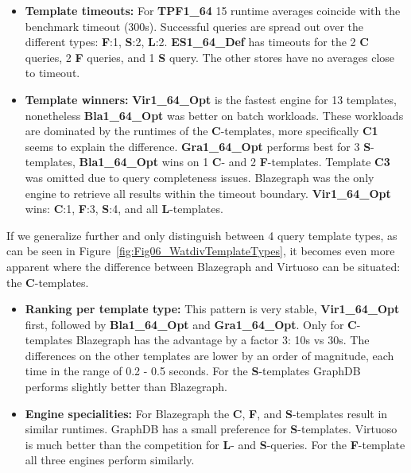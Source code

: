 \begin{itemize}
	\item \textbf{Template timeouts:} For \textbf{TPF1\_64} 15 runtime averages coincide with the benchmark timeout (300s). Successful queries are spread out over the different types: \textbf{F}:1, \textbf{S}:2, \textbf{L}:2.
	\textbf{ES1\_64\_Def} has timeouts for the 2 \textbf{C} queries,  2 \textbf{F} queries, and 1 \textbf{S} query. The other stores have no averages close to timeout.
	
	\item  \textbf{Template winners:} \textbf{Vir1\_64\_Opt} is the fastest engine for 13 templates, nonetheless \textbf{Bla1\_64\_Opt} was better on batch workloads. These workloads are dominated by the runtimes of the \textbf{C}-templates, more specifically \textbf{C1} seems to explain the difference. 
	\textbf{Gra1\_64\_Opt} performs best for 3 \textbf{S}-templates, \textbf{Bla1\_64\_Opt} wins on 1 \textbf{C}- and 2 \textbf{F}-templates. Template \textbf{C3} was omitted due to query completeness issues. Blazegraph was the only engine to retrieve all results within the timeout boundary.
	\textbf{Vir1\_64\_Opt} wins: \textbf{C}:1, \textbf{F}:3, \textbf{S}:4, and all \textbf{L}-templates.
\end{itemize}
If we generalize further and only distinguish between 4 query template types, as can be seen in Figure~\ref{fig:Fig06_WatdivTemplateTypes}, it becomes even more apparent where the difference between Blazegraph and Virtuoso can be situated: the \textbf{C}-templates.
\begin{itemize}
	\item \textbf{Ranking per template type:} This pattern is very stable, \textbf{Vir1\_64\_Opt} first, followed by \textbf{Bla1\_64\_Opt} and \textbf{Gra1\_64\_Opt}. Only for \textbf{C}-templates Blazegraph has the advantage  by a factor 3: 10s vs 30s. The differences on the other templates are lower by an order of magnitude, each time in the range of 0.2 - 0.5 seconds. For the \textbf{S}-templates GraphDB performs slightly better than Blazegraph.
	\item \textbf{Engine specialities:} For Blazegraph the \textbf{C}, \textbf{F}, and \textbf{S}-templates result in similar runtimes. GraphDB has a small preference for \textbf{S}-templates. Virtuoso is much better than the competition for \textbf{L}- and \textbf{S}-queries. For the \textbf{F}-template all three engines perform similarly.
\end{itemize}

